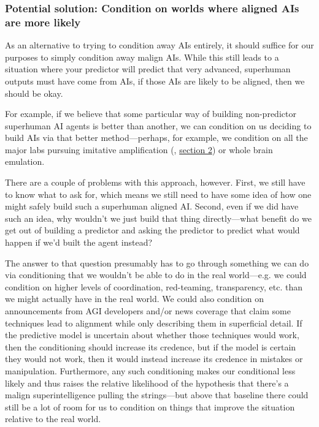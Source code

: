 \documentclass[
  twocolumn,
  natbib,
]{miri-tech-article}
\begin{document}
\subsubsection{Potential solution: Condition on worlds where aligned AIs are more likely}

As an alternative to trying to condition away AIs entirely, it should suffice for our purposes to simply condition away malign AIs. While this still leads to a situation where your predictor will predict that very advanced, superhuman outputs must have come from AIs, if those AIs are likely to be aligned, then we should be okay.

For example, if we believe that some particular way of building non-predictor superhuman AI agents is better than another, we can condition on us deciding to build AIs via that better method---perhaps, for example, we condition on all the major labs pursuing imitative amplification (\cite{11_proposals}, \href{https://www.alignmentforum.org/posts/fRsjBseRuvRhMPPE5/an-overview-of-11-proposals-for-building-safe-advanced-ai#2__Imitative_amplification___intermittent_oversight}{section 2}) or whole brain emulation\cite{wbe_lw}.

There are a couple of problems with this approach, however. First, we still have to know what to ask for, which means we still need to have some idea of how one might safely build such a superhuman aligned AI. Second, even if we did have such an idea, why wouldn't we just build that thing directly---what benefit do we get out of building a predictor and asking the predictor to predict what would happen if we'd built the agent instead?

The answer to that question presumably has to go through something we can do via conditioning that we wouldn't be able to do in the real world---e.g. we could condition on higher levels of coordination, red-teaming, transparency, etc. than we might actually have in the real world. We could also condition on announcements from AGI developers and/or news coverage that claim some techniques lead to alignment while only describing them in superficial detail. If the predictive model is uncertain about whether those techniques would work, then the conditioning should increase its credence, but if the model is certain they would not work, then it would instead increase its credence in mistakes or manipulation. Furthermore, any such conditioning makes our conditional less likely and thus raises the relative likelihood of the hypothesis that there's a malign superintelligence pulling the strings---but above that baseline there could still be a lot of room for us to condition on things that improve the situation relative to the real world.
\end{document}
